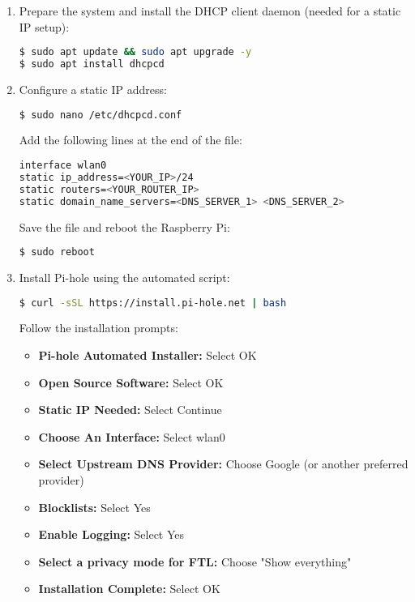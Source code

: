 \begin{enumerate}
\item Prepare the system and install the DHCP client daemon (needed for a static IP setup):
\begin{lstlisting}[language=bash, breaklines=true, breakatwhitespace=true, columns=fullflexible]
$ sudo apt update && sudo apt upgrade -y
$ sudo apt install dhcpcd
\end{lstlisting}
   
\item Configure a static IP address:
\begin{lstlisting}[language=bash, breaklines=true, breakatwhitespace=true, columns=fullflexible]
$ sudo nano /etc/dhcpcd.conf
\end{lstlisting}

Add the following lines at the end of the file:
\begin{lstlisting}[language=bash, breaklines=true, breakatwhitespace=true, columns=fullflexible]
interface wlan0
static ip_address=<YOUR_IP>/24
static routers=<YOUR_ROUTER_IP>
static domain_name_servers=<DNS_SERVER_1> <DNS_SERVER_2>
\end{lstlisting}

Save the file and reboot the Raspberry Pi:
\begin{lstlisting}[language=bash, breaklines=true, breakatwhitespace=true, columns=fullflexible]
$ sudo reboot
\end{lstlisting}

\item Install Pi-hole using the automated script:
\begin{lstlisting}[language=bash, breaklines=true, breakatwhitespace=true, columns=fullflexible]
$ curl -sSL https://install.pi-hole.net | bash
\end{lstlisting}

Follow the installation prompts:
\begin{itemize}
\item \textbf{Pi-hole Automated Installer:} Select OK
\item \textbf{Open Source Software:} Select OK
\item \textbf{Static IP Needed:} Select Continue
\item \textbf{Choose An Interface:} Select wlan0
\item \textbf{Select Upstream DNS Provider:} Choose Google (or another preferred provider)
\item \textbf{Blocklists:} Select Yes
\item \textbf{Enable Logging:} Select Yes
\item \textbf{Select a privacy mode for FTL:} Choose "Show everything"
\item \textbf{Installation Complete:} Select OK
\end{itemize}


\end{enumerate}
